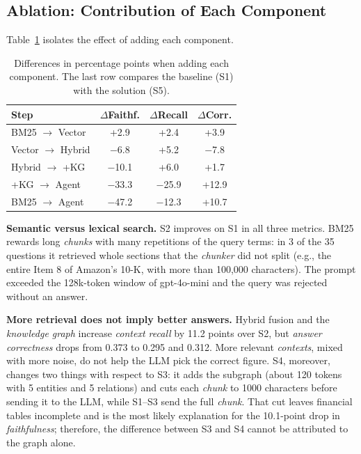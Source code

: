 \documentclass[conference]{IEEEtran}
\begin{document}
\subsection{Ablation: Contribution of Each Component}
Table~\ref{tab:ablacion} isolates the effect of adding each component.

\begin{table}[h]
\centering
\small
\begin{tabular}{lccc}
\toprule
\textbf{Step} & \textbf{$\Delta$Faithf.} & \textbf{$\Delta$Recall} & \textbf{$\Delta$Corr.} \\
\midrule
BM25 $\rightarrow$ Vector      & +2.9  & +2.4  & +3.9 \\
Vector $\rightarrow$ Hybrid    & $-$6.8  & +5.2  & $-$7.8 \\
Hybrid $\rightarrow$ +KG       & $-$10.1 & +6.0  & +1.7 \\
+KG $\rightarrow$ Agent        & $-$33.3 & $-$25.9 & +12.9 \\
\midrule
BM25 $\rightarrow$ Agent       & $-$47.2 & $-$12.3 & +10.7 \\
\bottomrule
\end{tabular}
\caption{Differences in percentage points when adding each component. The last row compares the baseline (S1) with the solution (S5).}
\label{tab:ablacion}
\end{table}

\textbf{Semantic versus lexical search.} S2 improves on S1 in all three metrics. BM25 rewards long \textit{chunks} with many repetitions of the query terms: in 3 of the 35 questions it retrieved whole sections that the \textit{chunker} did not split (e.g., the entire Item 8 of Amazon's 10-K, with more than 100{,}000 characters). The prompt exceeded the 128k-token window of gpt-4o-mini and the query was rejected without an answer.

\textbf{More retrieval does not imply better answers.} Hybrid fusion and the \textit{knowledge graph} increase \textit{context recall} by 11.2 points over S2, but \textit{answer correctness} drops from 0.373 to 0.295 and 0.312. More relevant \textit{contexts}, mixed with more noise, do not help the LLM pick the correct figure. S4, moreover, changes two things with respect to S3: it adds the subgraph (about 120 tokens with 5 entities and 5 relations) and cuts each \textit{chunk} to 1000 characters before sending it to the LLM, while S1--S3 send the full \textit{chunk}. That cut leaves financial tables incomplete and is the most likely explanation for the 10.1-point drop in \textit{faithfulness}; therefore, the difference between S3 and S4 cannot be attributed to the graph alone.
\end{document}
